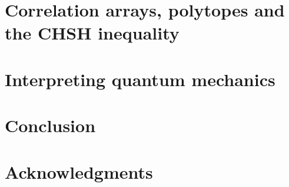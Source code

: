 \documentclass[12pt]{article}
\numberwithin{equation}{section}
\begin{document}
\section{Correlation arrays, polytopes and the CHSH inequality} \label{3}


\section{Interpreting quantum mechanics} \label{4}


\section{Conclusion} \label{5}



\section*{Acknowledgments}
\end{document}
